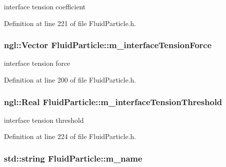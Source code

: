 interface tension coefficient 



Definition at line 221 of file FluidParticle.h.

\hypertarget{class_fluid_particle_a1eed81ac818dc7d027490e912aa880c8}{
\subsubsection[{m\_\-interfaceTensionForce}]{\setlength{\rightskip}{0pt plus 5cm}ngl::Vector {\bf FluidParticle::m\_\-interfaceTensionForce}}}
\label{class_fluid_particle_a1eed81ac818dc7d027490e912aa880c8}


interface tension force 



Definition at line 200 of file FluidParticle.h.

\hypertarget{class_fluid_particle_a654e0edda2cb46780451fd98e0613211}{
\subsubsection[{m\_\-interfaceTensionThreshold}]{\setlength{\rightskip}{0pt plus 5cm}ngl::Real {\bf FluidParticle::m\_\-interfaceTensionThreshold}}}
\label{class_fluid_particle_a654e0edda2cb46780451fd98e0613211}


interface tension threshold 



Definition at line 224 of file FluidParticle.h.

\hypertarget{class_fluid_particle_a58aafd3376c4f7504b4b6a045d3b693e}{
\subsubsection[{m\_\-name}]{\setlength{\rightskip}{0pt plus 5cm}std::string {\bf FluidParticle::m\_\-name}}}
\label{class_fluid_particle_a58aafd3376c4f7504b4b6a045d3b693e}


